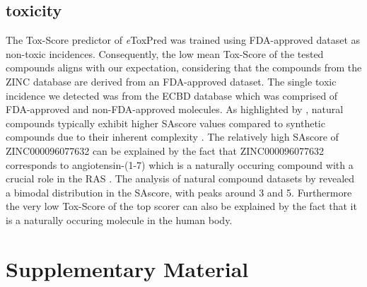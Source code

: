 \documentclass[11pt, letterpaper, titlepage]{article}
\begin{document}
\subsection{toxicity}
The Tox-Score predictor of \textit{e}ToxPred was trained using \ac{FDA}-approved dataset as non-toxic incidences. Consequently, the low mean Tox-Score of the tested compounds aligns with our expectation, considering that the compounds from the ZINC database are derived from an \ac{FDA}-approved dataset. The single toxic incidence we detected was from the ECBD database which was comprised of \ac{FDA}-approved and non-\ac{FDA}-approved molecules.
As highlighted by \citeauthor{pu2019toxpred}, natural compounds typically exhibit higher \ac{SAscore} values compared to synthetic compounds due to their inherent complexity \cite{pu2019toxpred}. The relatively high \ac{SAscore} of ZINC000096077632 can be explained by the fact that ZINC000096077632 corresponds to angiotensin-(1-7) which is a naturally occuring compound with a crucial role in the \ac{RAS} \cite{santos2014angiotensin}. The analysis of natural compound datasets by \citeauthor{pu2019toxpred} revealed a bimodal distribution in the \ac{SAscore}, with peaks around 3 and 5. Furthermore the very low Tox-Score of the top scorer can also be explained by the fact that it is a naturally occuring molecule in the human body.

\section{Supplementary Material}

\pagebreak
\FloatBarrier
\renewcommand{\bibname}{References}  %
\printbibliography
\end{document}
